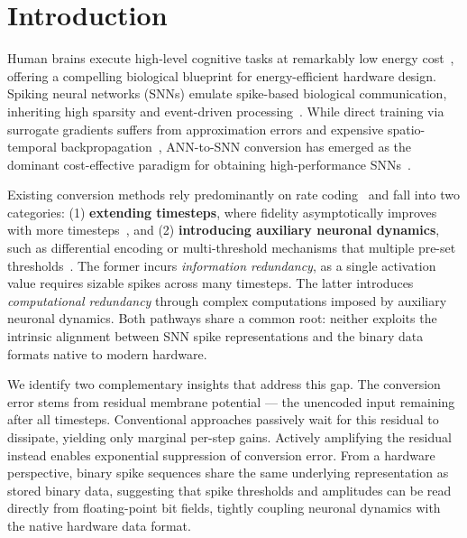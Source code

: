 \section{Introduction}

 Human brains execute high-level cognitive tasks at remarkably low energy cost~\cite{gerstner2014neuronal,izhikevich2003simple}, offering a compelling biological blueprint for energy-efficient hardware design. Spiking neural networks (SNNs) emulate spike-based biological communication, inheriting high sparsity and event-driven processing~\cite{maass1997networks,davies2018loihi}. While direct training via surrogate gradients suffers from approximation errors and expensive spatio-temporal backpropagation~\cite{gygax2024,zhu2024osr}, ANN-to-SNN conversion has emerged as the dominant cost-effective paradigm for obtaining high-performance SNNs~\cite{cao2015spiking}.

Existing conversion methods rely predominantly on rate coding~\cite{rueckauer2017conversion} and fall into two categories: (1) \textbf{extending timesteps}, where fidelity asymptotically improves with more timesteps~\cite{jelly}, and (2) \textbf{introducing auxiliary neuronal dynamics}, such as differential encoding or multi-threshold mechanisms that    multiple pre-set thresholds~\cite{dcgs,spikellm}. The former incurs \textit{information redundancy}, as a single activation value requires sizable spikes across many timesteps. The latter introduces \textit{computational redundancy} through complex computations imposed by auxiliary neuronal dynamics. Both pathways share a common root: neither exploits the intrinsic alignment between SNN spike representations and the binary data formats native to modern hardware.

We identify two complementary insights that address this gap. %
The conversion error stems from residual membrane potential — the unencoded input remaining after all timesteps. Conventional approaches passively wait for this residual to dissipate, yielding only marginal per-step gains. Actively amplifying the residual instead enables exponential suppression of conversion error. From a hardware perspective, binary spike sequences share the same underlying representation as stored binary data, suggesting that spike thresholds and amplitudes can be read directly from floating-point bit fields, tightly coupling neuronal dynamics with the native hardware data format.

